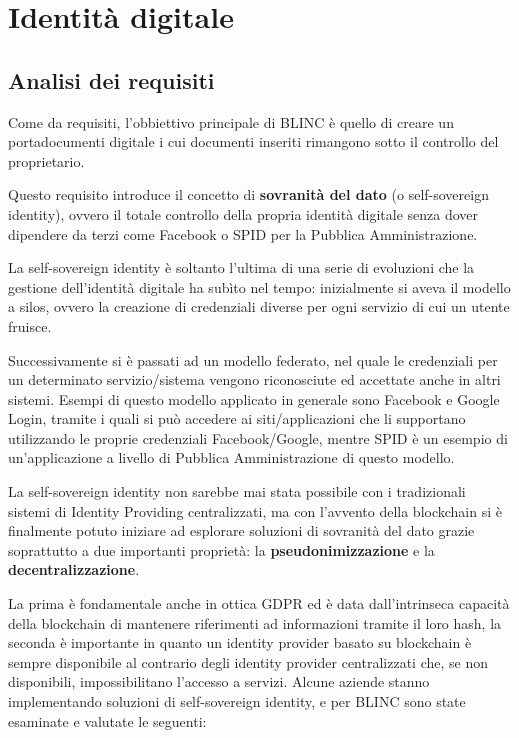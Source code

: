 \chapter{Identità digitale}

\section{Analisi dei requisiti}
Come da requisiti, l’obbiettivo principale di BLINC è quello di creare un portadocumenti digitale
i cui documenti inseriti rimangono sotto il controllo del proprietario.

Questo requisito introduce il concetto di \textbf{sovranità del dato} (o self-sovereign identity), ovvero il totale
controllo della propria identità digitale senza dover dipendere da terzi come Facebook o SPID per la Pubblica Amministrazione.

La self-sovereign identity è soltanto l’ultima di una serie di evoluzioni che la gestione dell’identità digitale
ha subìto nel tempo: inizialmente si aveva il modello a silos, ovvero la creazione di credenziali diverse per ogni
servizio di cui un utente fruisce.

Successivamente si è passati ad un modello federato, nel quale le credenziali per un determinato servizio/sistema
vengono riconosciute ed accettate anche in altri sistemi. Esempi di questo modello applicato in generale sono
Facebook e Google Login, tramite i quali si può accedere ai siti/applicazioni che li supportano utilizzando le
proprie credenziali Facebook/Google, mentre SPID è un esempio di un’applicazione a livello di Pubblica Amministrazione 
di questo modello. 

La self-sovereign identity non sarebbe mai stata possibile con i tradizionali sistemi di Identity Providing
centralizzati, ma con l’avvento della blockchain si è finalmente potuto iniziare ad esplorare soluzioni di sovranità
del dato grazie soprattutto a due importanti proprietà: la \textbf{pseudonimizzazione} e la \textbf{decentralizzazione}.

La prima è fondamentale anche in ottica GDPR ed è data dall’intrinseca capacità della blockchain di mantenere 
riferimenti ad informazioni tramite il loro hash, la seconda è importante in quanto un 
identity provider basato su blockchain è sempre disponibile al contrario degli identity provider centralizzati che,
se non disponibili, impossibilitano l’accesso a servizi.
Alcune aziende stanno implementando soluzioni di self-sovereign identity, e per BLINC sono state esaminate e
valutate le seguenti:


